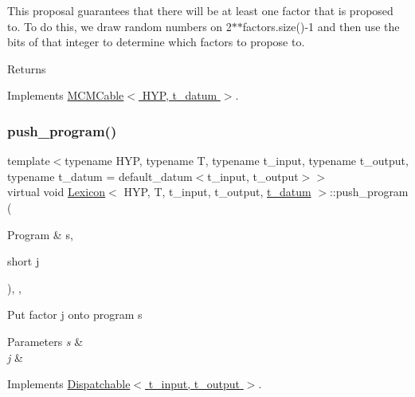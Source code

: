 This proposal guarantees that there will be at least one factor that is proposed to. To do this, we draw random numbers on 2$\ast$$\ast$factors.size()-\/1 and then use the bits of that integer to determine which factors to propose to. \begin{DoxyReturn}{Returns}

\end{DoxyReturn}


Implements \hyperlink{class_m_c_m_cable_ab119a14256ab92c5c1e941f8492df830}{M\+C\+M\+Cable$<$ H\+Y\+P, t\+\_\+datum $>$}.

\mbox{\label{class_lexicon_a4473f60c7ebdded00ac5cc9b00a2f4f6}} 
\subsubsection{\texorpdfstring{push\+\_\+program()}{push\_program()}}
{\footnotesize\ttfamily template$<$typename H\+YP, typename T, typename t\+\_\+input, typename t\+\_\+output, typename t\+\_\+datum = default\+\_\+datum$<$t\+\_\+input, t\+\_\+output$>$$>$ \\
virtual void \hyperlink{class_lexicon}{Lexicon}$<$ H\+YP, T, t\+\_\+input, t\+\_\+output, \hyperlink{class_bayesable_a7c93a2eeab708378eb321745908718d4}{t\+\_\+datum} $>$\+::push\+\_\+program (\begin{DoxyParamCaption}\item[{Program \&}]{s,  }\item[{short}]{j }\end{DoxyParamCaption})\hspace{0.3cm}{\ttfamily [inline]}, {\ttfamily [override]}, {\ttfamily [virtual]}}

Put factor j onto program s 
\begin{DoxyParams}{Parameters}
{\em s} & \\
\hline
{\em j} & \\
\hline
\end{DoxyParams}


Implements \hyperlink{class_dispatchable_a9339c2906f7c8dadbe1d0ca79dd9bb11}{Dispatchable$<$ t\+\_\+input, t\+\_\+output $>$}.

\mbox{\label{class_lexicon_a5817e922e09a2723c53eb69506f647fb}} 
